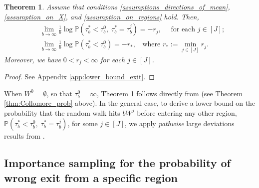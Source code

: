 \documentclass[aap,preprint]{imsart}
\newcommand{\Pro}{{\mathbb{P}}}
\theoremstyle{plain}
\newtheorem{theorem}{Theorem}[section]
\theoremstyle{definition}
\begin{document}
\begin{theorem}\label{thm:prob_rate}
Assume that conditions \eqref{assumptions_directions_of_mean}, \eqref{assumption_on_X}, and \eqref{assumption_on_regions} hold. Then, 
\begin{align*}
    &\lim_{b \to \infty} \frac{1}{b} \log \Pro(\tau_b^* < \tau_b^0,\; \tau_b^* = \tau_b^j) = -r_j, \quad \text{ for each } j \in [J];\\
    &\lim_{b \to \infty} \frac{1}{b} \log \Pro(\tau_b^* < \tau_b^0) = -r_*, \;\; \text{ where } r_* := \min_{j \in [J]} r_j.
\end{align*}
Moreover, we have $0 < r_j < \infty$ for each $j \in [J]$.
\end{theorem} 
\begin{proof}
See Appendix \ref{app:lower_bound_exit}. 
\end{proof}


When $W^0 = \emptyset$, so that $\tau_b^0 = \infty$, Theorem \ref{thm:prob_rate} follows directly from \cite{collamore1996} (see Theorem \ref{thm:Collomore_prob} above). In the general case, to derive a lower bound on the probability that the random walk hits $bW^j$ before entering any other region,
$\Pro(\tau_b^* < \tau_b^0,\; \tau_b^* = \tau_b^j)$,
for some $j \in [J]$,  we apply \textit{pathwise} large deviations results from \cite{borovkov2012large}.





\subsection{Importance sampling for the probability of wrong exit from a specific region}\label{sec:IS_general0}



\end{document}
